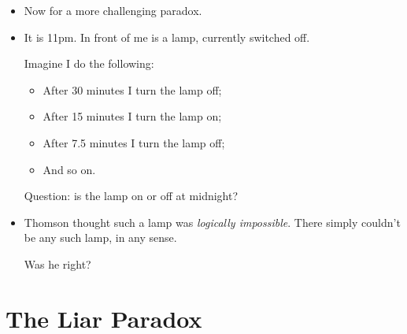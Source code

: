 \documentclass[justified]{tufte-handout}
\begin{document}
\begin{itemize}


\item Now for a more challenging paradox.


\item It is 11pm. In front of me is a lamp, currently switched off.

 Imagine I do the following:

\begin{itemize}

\item After 30 minutes I turn the lamp off;

\item After 15 minutes I turn the lamp on;

\item After 7.5 minutes I turn the lamp off;

\item And so on. 


\end{itemize}

Question: is the lamp on or off at midnight?



\item Thomson thought such a lamp was \emph{logically impossible}. There simply couldn't be any such lamp, in any sense. 

\vspace{.2cm}
\noindent Was he right?





\end{itemize}




\section{The Liar Paradox}
\end{document}
